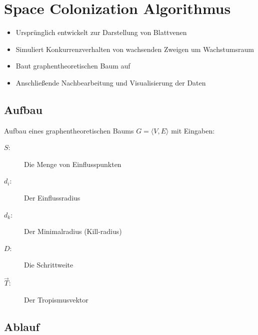 \newpage
\slidetitle{}
\section{Space Colonization Algorithmus\\}

\begin{itemize}
	\item Ursprünglich entwickelt zur Darstellung von Blattvenen \\
	
	\item Simuliert Konkurrenzverhalten von wachsenden Zweigen um Wachstumsraum\\
	
	\item Baut graphentheoretischen Baum auf \\
	
	\item Anschließende Nachbearbeitung und Visualisierung der Daten
\end{itemize}




\newpage
{}
\subsection{Aufbau}
Aufbau eines graphentheoretischen Baums $G = \langle V,E \rangle$ mit Eingaben:
\begin{description}
\item[\boldmath$S:$] Die Menge von Einflusspunkten\\

\item[\boldmath$d_i:$] Der Einflussradius\\

\item[\boldmath$d_k:$] Der Minimalradius (Kill-radius)\\

\item[\boldmath$D:$] Die Schrittweite\\

\item[\boldmath$\overrightarrow{T}:$] Der Tropismusvektor
\end{description}




\newpage
{}
\subsection{Ablauf}

